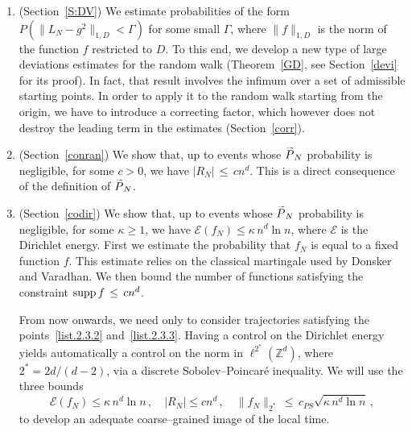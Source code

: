 \documentclass[10pt]{amsart}
\theoremstyle{definition}\newtheorem{defi}[theo]{Definition}\newtheorem{rema}[theo]{Remark}\newtheorem{exam}[theo]{Example}\newtheorem{exem}[theo]{Example}\newtheorem{nota}[theo]{Notation}
\newcommand*\supp{\text{supp\,}}
\newcommand*\Zd {{\mathbb Z^d}}
\newcommand*\wP{\smash{\widetilde P}}
\newcommand{\cE}{\mathcal{E}}
\newcommand*{\romanenumi}{\renewcommand*{\theenumi}{\roman{enumi}}}
\begin{document}
\begin{enumerate}\romanenumi
\item \label{list.2.3.1}(Section~\ref{S:DV}) We estimate probabilities of the form $P(\|L_N-g^2\|_{1,D}<\Gamma)$ for some small $\Gamma$, where $\| f \|_{1,D}$ is the norm of the function $f$ restricted to $D$. To this end, we develop a new type of large deviations estimates for the random walk (Theorem~\ref{GD}, see Section~\ref{devi} for its proof). In fact, that result involves the infimum over a set of admissible starting points. In order to apply it to the random walk starting from the origin, we have to introduce a correcting factor, which however does not destroy the leading term in the estimates (Section~\ref{corr}).
%



\item \label{list.2.3.2}(Section~\ref{conran}) We show that, up to events whose $\wP_N$ probability is negligible, for some $c>0$, we have $|R_N|\,\leq\, cn^d$. This is a direct consequence of the definition of $\wP_N$.

\item \label{list.2.3.3}(Section~\ref{codir}) We show that, up to events whose $\wP_N$ probability is negligible, for some $\kappa\geq 1$, we have $\cE(f_N)\leq\kappa \,n^d\ln n$, where $\cE$ is the Dirichlet energy. First we estimate the probability that $f_N$ is equal to a fixed function $f$. This estimate relies on the classical martingale used by Donsker and Varadhan. We then bound the number of functions satisfying the constraint $\supp f\,\leq\, cn^d$.

From now onwards, we need only to consider trajectories satisfying the points~\eqref{list.2.3.2} and~\eqref{list.2.3.3}. Having a control on the Dirichlet energy yields automatically a control on the norm in $\ell^{2^*}(\Zd)$, where $2^*=2d/(d-2)$, via a discrete Sobolev--Poincaré inequality. We will use the three bounds
\[
\cE(f_N)\leq\kappa \,n^d\ln n\,,\quad
|R_N|\leq cn^d\,,\quad \|f_N\|_{2^*}
\,\leq\, c_{PS}
\sqrt{\kappa \,n^d\ln n}\,,
\]
to develop an adequate coarse--grained image of the local time.



\end{enumerate}
\end{document}
